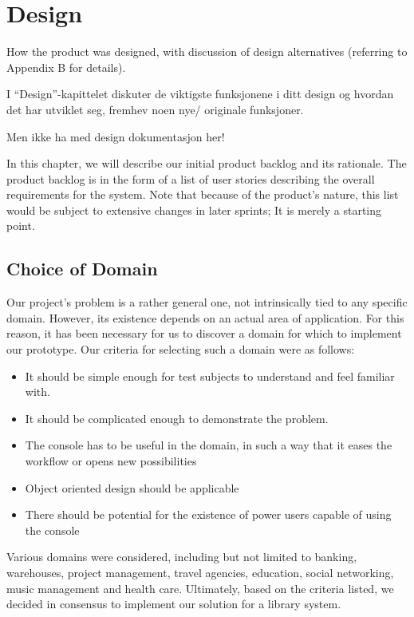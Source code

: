 \chapter{Design}

\minitoc

How the product was designed,   with    discussion  of  design  alternatives
(referring  to  Appendix    B   for details).

I “Design”-kapittelet diskuter de viktigste funksjonene i ditt
design og hvordan det har utviklet seg, fremhev noen nye/
originale funksjoner.

Men ikke ha med design dokumentasjon her!


In this chapter, we will describe our initial product backlog and its rationale. The product backlog is in the form of a list of user stories describing the overall requirements for the system. Note that because of the product's nature, this list would be subject to extensive changes in later sprints; It is merely a starting point.

\clearpage

\section{Choice of Domain}
Our project's problem is a rather general one, not intrinsically tied to any specific domain. However, its existence depends on an actual area of application. For this reason, it has been necessary for us to discover a domain for which to implement our prototype. Our criteria for selecting such a domain were as follows:
\begin{itemize}
\item It should be simple enough for test subjects to understand and feel familiar with.
\item It should be complicated enough to demonstrate the problem.
\item The console has to be useful in the domain, in such a way that it eases the workflow or opens new possibilities
\item Object oriented design should be applicable
\item There should be potential for the existence of power users capable of using the console
\end{itemize}
Various domains were considered, including but not limited to banking, warehouses, project management, travel agencies, education, social networking, music management and health care. Ultimately, based on the criteria listed, we decided in consensus to implement our solution for a library system.


